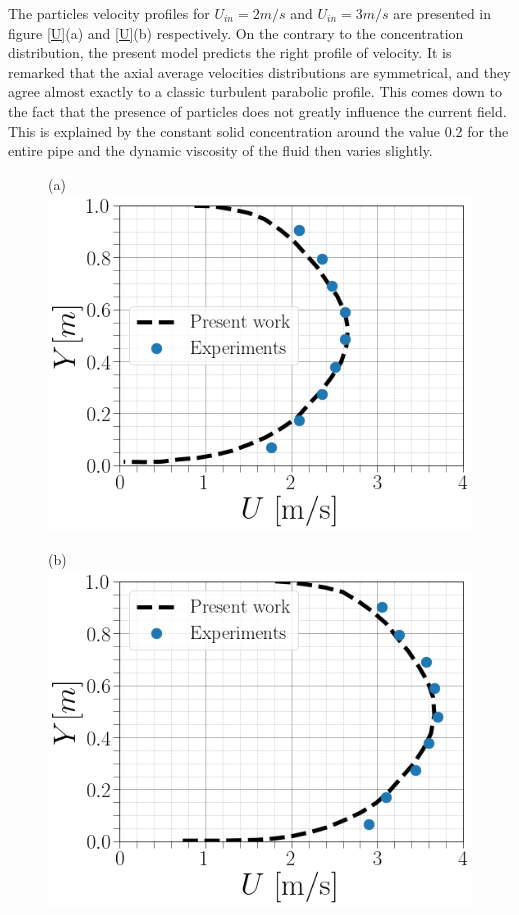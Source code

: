 \documentclass[11pt]{report}
\begin{document}
\begin{minipage}[t]{0.35\textwidth}
\begin{minipage}[t]{0.5\textwidth}
\begin{minipage}[t]{0.35\textwidth}
\begin{minipage}[t]{0.35\textwidth}
 The particles velocity  profiles for $U_{in} = 2 m/s$ and $U_{in} = 3 m/s$ are presented in figure \ref{U}(a) and \ref{U}(b) respectively. 
 On the contrary to the concentration distribution, the present model predicts the right profile of velocity. 
 It is remarked that the axial average velocities  distributions are symmetrical, and they agree almost exactly to a classic turbulent parabolic profile. 
 This comes down to the fact that the presence of particles does not greatly influence the current field. 
 This is explained by the constant solid concentration around the value 0.2 for the entire pipe and the dynamic viscosity of the fluid then varies slightly.\\
%
 \begin{figure}[ht!]
 \begin{center}
 (a)\includegraphics[scale = 0.3]{figs/V22}
 \end{center}
 \end{figure}
%
 \begin{figure}[ht!]
 \begin{center}
 (b)\includegraphics[scale = 0.3]{figs/3CFD}

\end{center}
\end{figure}
\end{minipage}
\end{minipage}
\end{minipage}
\end{minipage}
\end{document}
